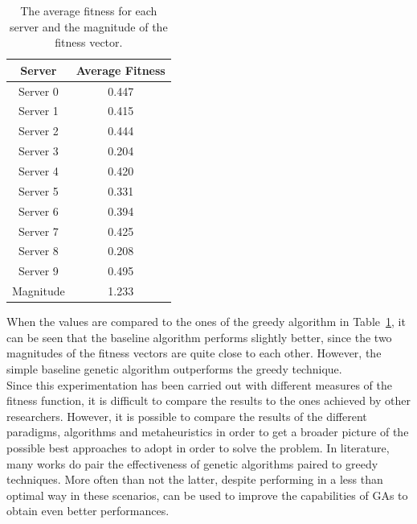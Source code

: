 \begin{table}[ht]
    \centering
    \begin{tabular}{|c|c|}
        \hline
        Server & Average Fitness \\
        \hline
        Server 0 & 0.447 \\
        Server 1 & 0.415 \\
        Server 2 & 0.444 \\
        Server 3 & 0.204 \\
        Server 4 & 0.420 \\
        Server 5 & 0.331 \\
        Server 6 & 0.394 \\
        Server 7 & 0.425 \\
        Server 8 & 0.208 \\
        Server 9 & 0.495 \\
        \hline
        Magnitude & 1.233 \\
        \hline
    \end{tabular}
    \caption{The average fitness for each server and the magnitude of the fitness vector.}
    \label{tab:average_greedy_fitness}
\end{table}

When the values are compared to the ones of the greedy algorithm in Table~\ref{tab:average_greedy_fitness}, it can be seen that the baseline algorithm
performs slightly better, since the two magnitudes of the fitness vectors are quite close to each other.
However, the simple baseline genetic algorithm outperforms the greedy technique.\\

Since this experimentation has been carried out with different measures of the fitness function, it is difficult to compare the results to the ones achieved
by other researchers. However, it is possible to compare the results of the different paradigms, algorithms and metaheuristics in order to get a broader picture of the
possible best approaches to adopt in order to solve the problem.
In literature, many works do pair the effectiveness of genetic algorithms paired to greedy techniques. More often than not the latter, despite performing in a less
than optimal way in these scenarios, can be used to improve the capabilities of GAs to obtain even better performances.~\cite{AHUJA2000917}

\newpage